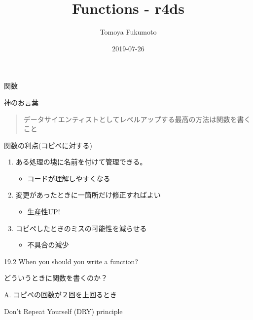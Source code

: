 \documentclass[ignorenonframetext,]{beamer}
\title{Functions - r4ds}
\author{Tomoya Fukumoto}
\date{2019-07-26}
\providecommand{\tightlist}{%
  \setlength{\itemsep}{0pt}\setlength{\parskip}{0pt}}
\begin{document}
\frame{\titlepage}

\begin{frame}{関数}

\begin{block}{神のお言葉}

\begin{quote}
データサイエンティストとしてレベルアップする最高の方法は関数を書くこと
\end{quote}

\end{block}

\begin{block}{関数の利点(コピペに対する)}

\begin{enumerate}
\def\labelenumi{\arabic{enumi}.}
\tightlist
\item
  ある処理の塊に名前を付けて管理できる。

  \begin{itemize}
  \tightlist
  \item
    コードが理解しやすくなる
  \end{itemize}
\item
  変更があったときに一箇所だけ修正すればよい

  \begin{itemize}
  \tightlist
  \item
    生産性UP!
  \end{itemize}
\item
  コピペしたときのミスの可能性を減らせる

  \begin{itemize}
  \tightlist
  \item
    不具合の減少
  \end{itemize}
\end{enumerate}

\end{block}

\end{frame}

\begin{frame}{19.2 When you should you write a function?}

どういうときに関数を書くのか？

A. コピペの回数が２回を上回るとき

{ Don't Repeat Yourself (DRY) principle}

\end{frame}
\end{document}
